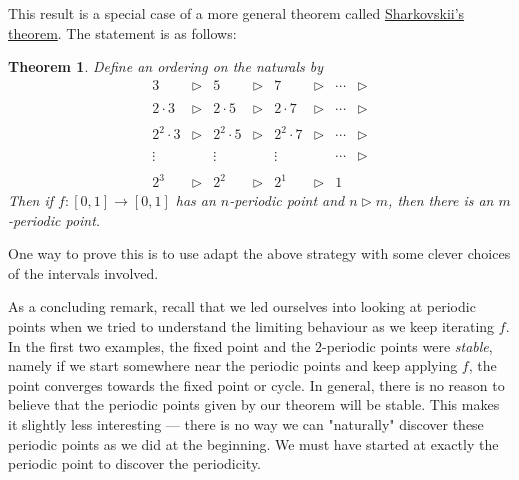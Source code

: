 \documentclass{shortart}
\newtheorem*{thm}{Theorem}
\theoremstyle{definition}
\begin{document}
This result is a special case of a more general theorem called \href{https://en.wikipedia.org/wiki/Sharkovskii\%27s_theorem}{Sharkovskii's theorem}. The statement is as follows:

\begin{thm}
  Define an ordering on the naturals by
  \[
    \begin{array}{cccccccc}
      3 &\rhd& 5 &\rhd& 7 &\rhd& \cdots &\rhd\\\\ 2\cdot 3 &\rhd& 2 \cdot 5 & \rhd & 2 \cdot 7 & \rhd & \cdots & \rhd\\\\ 2^2\cdot 3 &\rhd& 2^2 \cdot 5 & \rhd & 2^2 \cdot 7 & \rhd & \cdots & \rhd\\\\ \vdots & & \vdots & & \vdots & & \cdots & \rhd\\\\ 2^3 & \rhd & 2^2 & \rhd & 2^1 & \rhd & 1
    \end{array}
  \]
  Then if $f: [0, 1] \to [0, 1]$ has an $n$-periodic point and $n \rhd m$, then there is an $m$-periodic point.
\end{thm}

One way to prove this is to use adapt the above strategy with some clever choices of the intervals involved.

As a concluding remark, recall that we led ourselves into looking at periodic points when we tried to understand the limiting behaviour as we keep iterating $f$. In the first two examples, the fixed point and the $2$-periodic points were \emph{stable}, namely if we start somewhere near the periodic points and keep applying $f$, the point converges towards the fixed point or cycle. In general, there is no reason to believe that the periodic points given by our theorem will be stable. This makes it slightly less interesting --- there is no way we can "naturally" discover these periodic points as we did at the beginning. We must have started at exactly the periodic point to discover the periodicity.
\end{document}

